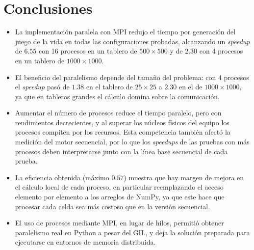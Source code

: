 \documentclass{article}
\begin{document}
\section{Conclusiones}
\begin{itemize}
    \item La implementación paralela con MPI redujo el tiempo por generación del juego de la vida en todas las configuraciones probadas, alcanzando un \textit{speedup} de $6.55$ con 16 procesos en un tablero de $500 \times 500$ y de $2.30$ con 4 procesos en un tablero de $1000 \times 1000$.
    \item El beneficio del paralelismo depende del tamaño del problema: con 4 procesos el \textit{speedup} pasó de $1.38$ en el tablero de $25 \times 25$ a $2.30$ en el de $1000 \times 1000$, ya que en tableros grandes el cálculo domina sobre la comunicación.
    \item Aumentar el número de procesos reduce el tiempo paralelo, pero con rendimientos decrecientes, y al superar los núcleos físicos del equipo los procesos compiten por los recursos. Esta competencia también afectó la medición del motor secuencial, por lo que los \textit{speedups} de las pruebas con más procesos deben interpretarse junto con la línea base secuencial de cada prueba.
    \item La eficiencia obtenida (máximo $0.57$) muestra que hay margen de mejora en el cálculo local de cada proceso, en particular reemplazando el acceso elemento por elemento a los arreglos de NumPy, ya que este hace que procesar cada celda sea más costoso que en la versión secuencial.
    \item El uso de procesos mediante MPI, en lugar de hilos, permitió obtener paralelismo real en Python a pesar del GIL, y deja la solución preparada para ejecutarse en entornos de memoria distribuida.
\end{itemize}
\end{document}
